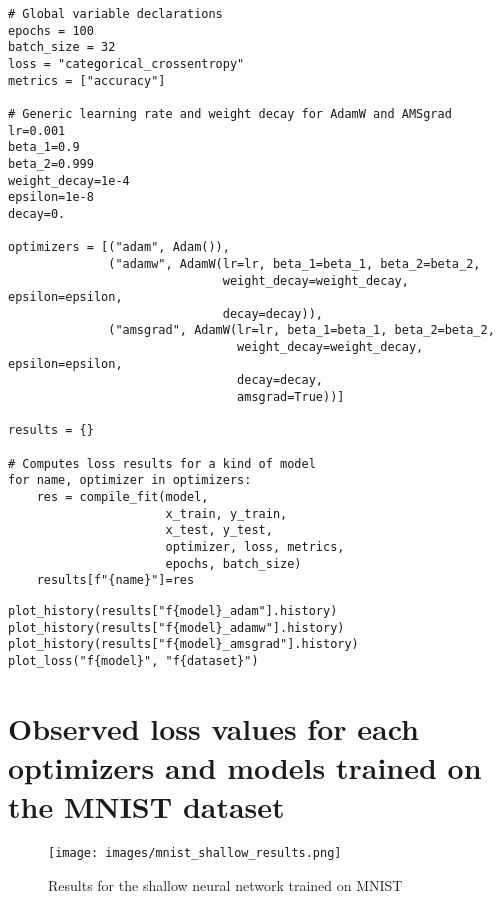 \documentclass{article} %
\begin{document}
\lstset{language=Python}
\lstset{frame=lines}
\lstset{basicstyle=\footnotesize}
\begin{lstlisting}
# Global variable declarations
epochs = 100
batch_size = 32
loss = "categorical_crossentropy"
metrics = ["accuracy"]

# Generic learning rate and weight decay for AdamW and AMSgrad
lr=0.001
beta_1=0.9
beta_2=0.999
weight_decay=1e-4
epsilon=1e-8
decay=0.

optimizers = [("adam", Adam()), 
              ("adamw", AdamW(lr=lr, beta_1=beta_1, beta_2=beta_2, 
                              weight_decay=weight_decay, epsilon=epsilon, 
                              decay=decay)), 
              ("amsgrad", AdamW(lr=lr, beta_1=beta_1, beta_2=beta_2, 
                                weight_decay=weight_decay, epsilon=epsilon, 
                                decay=decay,
                                amsgrad=True))]

results = {}

# Computes loss results for a kind of model
for name, optimizer in optimizers:
    res = compile_fit(model, 
                      x_train, y_train, 
                      x_test, y_test,
                      optimizer, loss, metrics,
                      epochs, batch_size)
    results[f"{name}"]=res
\end{lstlisting}

\lstset{language=Python}
\lstset{frame=lines}
\lstset{basicstyle=\footnotesize}
\begin{lstlisting}
plot_history(results["f{model}_adam"].history)
plot_history(results["f{model}_adamw"].history)
plot_history(results["f{model}_amsgrad"].history)
plot_loss("f{model}", "f{dataset}")
\end{lstlisting}

\newpage
\section{Observed loss values for each optimizers and models trained on the MNIST dataset}

\begin{figure}[h]
\begin{center}
\texttt{[image: images/mnist\_shallow\_results.png]}
\end{center}
\caption{Results for the shallow neural network trained on MNIST}
\end{figure}
\end{document}
